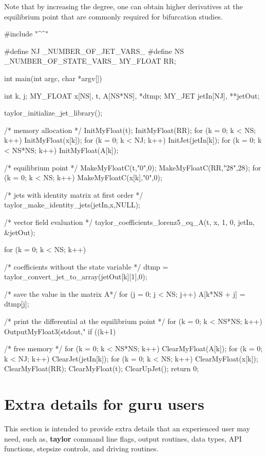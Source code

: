 \documentclass[10pt]{article}
\theoremstyle{remark}
\newcommand{\taylorname}{{\bf taylor}}
\newcommand{\mainfile}{}
\newcommand{\odehfile}{}
\begin{document}
Note that by increasing the degree, one can obtain higher derivatives
at the equilibrium point that are commonly required for bifurcation
studies.
\begin{code}[title={File: \mainfile{}}]
    #include "^\odehfile{}^"

    #define NJ _NUMBER_OF_JET_VARS_
    #define NS _NUMBER_OF_STATE_VARS_
    MY_FLOAT RR;
    
    int main(int argc, char *argv[])
    {
      int k, j;
      MY_FLOAT x[NS], t, A[NS*NS], *dtmp;
      MY_JET jetIn[NJ], **jetOut;
      
      taylor_initialize_jet_library();
      
      /* memory allocation */
      InitMyFloat(t);
      InitMyFloat(RR);
      for (k = 0; k < NS; k++) {InitMyFloat(x[k]);}
      for (k = 0; k < NJ; k++) {InitJet(jetIn[k]);}
      for (k = 0; k < NS*NS; k++) {InitMyFloat(A[k]);}
      
      /* equilibrium point */
      MakeMyFloatC(t,"0",0);
      MakeMyFloatC(RR,"28",28);
      for (k = 0; k < NS; k++) {MakeMyFloatC(x[k],"0",0);}
      
      /* jets with identity matrix at first order */
      taylor_make_identity_jets(jetIn,x,NULL);
      
      /* vector field evaluation */
      taylor_coefficients_lorenz5_eq_A(t, x, 1, 0, jetIn, &jetOut);
      
      for (k = 0; k < NS; k++) 
      {
        /* coefficients without the state variable */
        dtmp = taylor_convert_jet_to_array(jetOut[k][1],0);
        
        /* save the value in the matrix A*/
        for (j = 0; j < NS; j++) A[k*NS + j] = dtmp[j];   
      }
      
      /* print the differential at the equilibrium point */
      for (k = 0; k < NS*NS; k++) 
      {
        OutputMyFloat3(stdout,"%
        if ((k+1) %
      }
      
      /* free memory */
      for (k = 0; k < NS*NS; k++) {ClearMyFloat(A[k]);}
      for (k = 0; k < NJ; k++) {ClearJet(jetIn[k]);}
      for (k = 0; k < NS; k++) {ClearMyFloat(x[k]);}
      ClearMyFloat(RR); ClearMyFloat(t);
      ClearUpJet();
      return 0;
    }
\end{code}


\section{Extra details for guru users} \label{sec:advanced}
This section is intended to provide extra details that an experienced
user may need, such as, \taylorname{} command line flags, output
routines, data types, API functions, stepsize controls, and driving
routines.
\end{document}
